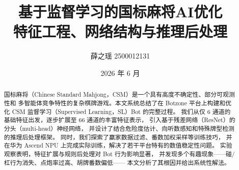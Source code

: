 \documentclass{article}
\title{%
  \textbf{基于监督学习的国标麻将AI优化}\\
  \large 特征工程、网络结构与推理后处理
}
\author{%
  薛之瑶 2500012131 \\
}
\date{2026 年 6 月}
\begin{document}
\maketitle
\thispagestyle{empty}

\begin{abstract}
国标麻将（Chinese Standard Mahjong，CSM）是一个具有高度不确定性、部分可观测性和
多智能体竞争特性的复杂棋牌游戏。本文系统总结了在 Botzone 平台上构建和优化 CSM
监督学习（Supervised Learning，SL）Bot 的完整过程。
我们从仅 $6$ 通道的基础特征出发，逐步扩展至 $66$ 通道的丰富特征表示，
引入基于残差网络（ResNet）的分头（multi-head）神经网络，
并设计了结合危险度估计、向听数感知和特殊牌型检测的推理后处理框架。
同时，我们探索了赢家数据过滤、番数加权采样等训练技巧，
并在华为 Ascend NPU 上完成实际训练，解决了若干平台特有的数值稳定性问题。
实验观察表明，特征扩展与规则后处理对 Bot 行为影响显著，
并发现多个有趣现象——碰/杠行为消失、点炮率过高、胡牌番数偏低——
本文分析了其根因并给出系统性解法。
\end{abstract}
\end{document}
